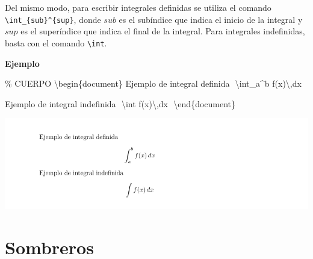 \documentclass[
  a4paper,
]{scrreport}
\newenvironment{Shaded}{\begin{snugshade}}{\end{snugshade}}
\newcommand{\CommentTok}[1]{\textcolor[rgb]{0.37,0.37,0.37}{#1}}
\newcommand{\ExtensionTok}[1]{\textcolor[rgb]{0.00,0.23,0.31}{#1}}
\newcommand{\KeywordTok}[1]{\textcolor[rgb]{0.00,0.23,0.31}{#1}}
\newcommand{\NormalTok}[1]{\textcolor[rgb]{0.00,0.23,0.31}{#1}}
\newcommand{\SpecialCharTok}[1]{\textcolor[rgb]{0.37,0.37,0.37}{#1}}
\newcommand{\SpecialStringTok}[1]{\textcolor[rgb]{0.13,0.47,0.30}{#1}}
\begin{document}
Del mismo modo, para escribir integrales definidas se utiliza el comando
\texttt{\textbackslash{}int\_\{sub\}\^{}\{sup\}}, donde \(sub\) es el
subíndice que indica el inicio de la integral y \(sup\) es el
superíndice que indica el final de la integral. Para integrales
indefinidas, basta con el comando \texttt{\textbackslash{}int}.

\textbf{Ejemplo}

\begin{Shaded}
\begin{Highlighting}[]
\CommentTok{\% CUERPO}
\KeywordTok{\textbackslash{}begin}\NormalTok{\{}\ExtensionTok{document}\NormalTok{\}}
\NormalTok{Ejemplo de integral definida}
\SpecialStringTok{$$}
\SpecialCharTok{\textbackslash{}int}\SpecialStringTok{\_a\^{}b f(x)}\SpecialCharTok{\textbackslash{},}\SpecialStringTok{dx}
\SpecialStringTok{$$}

\NormalTok{Ejemplo de integral indefinida}
\SpecialStringTok{$$}
\SpecialCharTok{\textbackslash{}int}\SpecialStringTok{ f(x)}\SpecialCharTok{\textbackslash{},}\SpecialStringTok{dx}
\SpecialStringTok{$$}
\KeywordTok{\textbackslash{}end}\NormalTok{\{}\ExtensionTok{document}\NormalTok{\}}
\end{Highlighting}
\end{Shaded}

\begin{tcolorbox}[enhanced jigsaw, bottomrule=.15mm, leftrule=.75mm, opacityback=0, titlerule=0mm, bottomtitle=1mm, colbacktitle=quarto-callout-note-color!10!white, arc=.35mm, toprule=.15mm, colframe=quarto-callout-note-color-frame, title={Salida}, coltitle=black, colback=white, breakable, toptitle=1mm, rightrule=.15mm, left=2mm, opacitybacktitle=0.6]

\includegraphics{./img/formulas/integral.png}

\end{tcolorbox}

\hypertarget{sombreros}{%
\section{Sombreros}\label{sombreros}}
\end{document}
